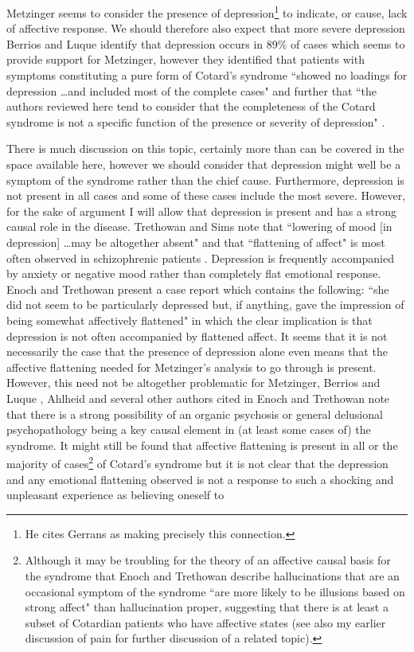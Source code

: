 Metzinger seems to consider the presence of depression\footnote{He \cite[pp. 457-458]{metzinger2003} cites Gerrans \cite[p. 112]{gerrans2000} as making precisely this connection.} to indicate, or cause, lack of affective response. We should therefore also expect that more severe depression Berrios and Luque identify that depression occurs in 89\% of cases which seems to provide support for Metzinger, however they identified that patients with symptoms constituting a pure form of Cotard's syndrome ``showed no loadings for depression \ldots and included most of the complete cases" and further that ``the authors reviewed here tend to consider that the completeness of the Cotard syndrome is not a specific function of the presence or severity of depression" \cite[p. 187]{berrios1995b}.

There is much discussion on this topic, certainly more than can be covered in the space available here, however we should consider that depression might well be a symptom of the syndrome rather than the chief cause. Furthermore, depression is not present in all cases and some of these cases include the most severe. However, for the sake of argument I will allow that depression is present and has a strong causal role in the disease. Trethowan and Sims note that ``lowering of mood [in depression] \ldots may be altogether absent" and that ``flattening of affect" is most often observed in schizophrenic patients \cite[p. 91]{trethowan1983}. Depression is frequently accompanied by anxiety or negative mood rather than completely flat emotional response. Enoch and Trethowan present a case report which contains the following: ``she did not seem to be particularly depressed but, if anything, gave the impression of being somewhat affectively flattened" \cite[p. 170]{enoch1991} in which the clear implication is that depression is not often accompanied by flattened affect. It seems that it is not necessarily the case that the presence of depression alone even means that the affective flattening needed for Metzinger's analysis to go through is present. However, this need not be altogether problematic for Metzinger, Berrios and Luque \cite[p. 187]{berrios1995b}, Ahlheid \cite[p. 927]{ahlheid1968} and several other authors cited in Enoch and Trethowan \cite[pp. 177-178]{enoch1991} note that there is a strong possibility of an organic psychosis or general delusional psychopathology being a key causal element in (at least some cases of) the syndrome. It might still be found that affective flattening is present in all or the majority of cases\footnote{Although it may be troubling for the theory of an affective causal basis for the syndrome that Enoch and Trethowan describe hallucinations that are an occasional symptom of the syndrome ``are more likely to be illusions based on strong affect" \cite[p. 174]{enoch1991} than hallucination proper, suggesting that there is at least a subset of Cotardian patients who have affective states (see also my earlier discussion of pain for further discussion of a related topic).} of Cotard's syndrome but it is not clear that the depression and any emotional flattening observed is not a response to such a shocking and unpleasant experience as believing oneself to 